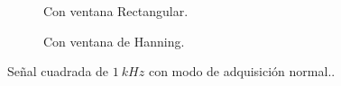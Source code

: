 \begin{figure}[H]
\begin{subfigure}[H]{0.39\textwidth}
        \caption{Con ventana Rectangular.}
      \end{subfigure}
      \hfill 
      \begin{subfigure}[H]{0.40\textwidth}
        \caption{Con ventana de Hanning.}
      \end{subfigure}

      \caption{Señal cuadrada de $1~kHz$ con modo de adquisición normal..}
      \label{fig:SeñalCuadModoNormal}
    \end{figure}


